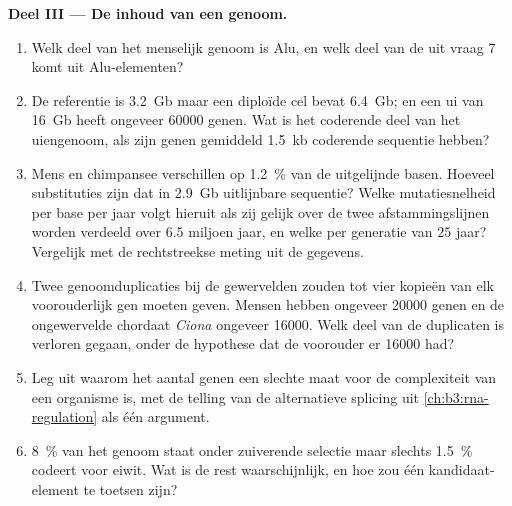 \begin{problem}
\medskip
\noindent\textbf{Deel III --- De inhoud van een genoom.}
\begin{enumerate}[resume]
  \item Welk deel van het menselijk genoom is Alu, en welk deel van de
         uit vraag 7 komt uit Alu-elementen?
  \item De referentie is \qty{3.2}{Gb} maar een diploïde cel bevat
        \qty{6.4}{Gb}; en een ui van \qty{16}{Gb} heeft ongeveer
        \num{60000} genen. Wat is het coderende deel van het
        uiengenoom, als zijn genen gemiddeld \qty{1.5}{kb} coderende
        sequentie hebben?
  \item Mens en chimpansee verschillen op \qty{1.2}{\%} van de
        uitgelijnde basen. Hoeveel substituties zijn dat in
        \qty{2.9}{Gb} uitlijnbare sequentie? Welke mutatiesnelheid per
        base per jaar volgt hieruit als zij gelijk over de twee
        afstammingslijnen worden verdeeld over $6.5$ miljoen jaar, en
        welke per generatie van $25$ jaar? Vergelijk met de
        rechtstreekse meting uit de gegevens.
  \item Twee genoomduplicaties bij de gewervelden zouden tot vier
        kopieën van elk voorouderlijk gen moeten geven. Mensen hebben
        ongeveer \num{20000} genen en de ongewervelde chordaat
        \emph{Ciona} ongeveer \num{16000}. Welk deel van de duplicaten
        is verloren gegaan, onder de hypothese dat de voorouder er
        \num{16000} had?
  \item Leg uit waarom het aantal genen een slechte maat voor de
        complexiteit van een organisme is, met de telling van de
        alternatieve splicing uit \cref{ch:b3:rna-regulation} als één
        argument.
  \item \qty{8}{\%} van het genoom staat onder zuiverende selectie maar
        slechts \qty{1.5}{\%} codeert voor eiwit. Wat is de rest
        waarschijnlijk, en hoe zou één kandidaat-element te toetsen
        zijn?
\end{enumerate}


\end{problem}
